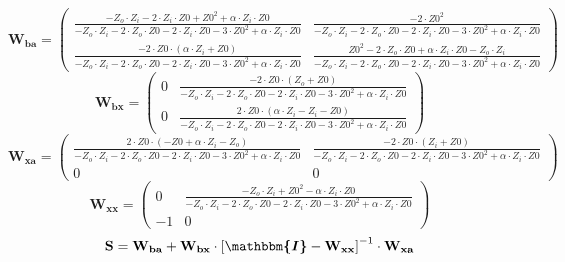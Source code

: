 \[ \mathbf{W_{ba}} = \left(\begin{smallmatrix} \frac{-Z_o\cdot
Z_i-2\cdot Z_i\cdot Z0+Z0^2+\alpha\cdot Z_i\cdot Z0}{-Z_o\cdot
Z_i-2\cdot Z_o\cdot Z0-2\cdot Z_i\cdot Z0-3\cdot Z0^2+\alpha\cdot
Z_i\cdot Z0} & \frac{-2\cdot Z0^2}{-Z_o\cdot Z_i-2\cdot Z_o\cdot
Z0-2\cdot Z_i\cdot Z0-3\cdot Z0^2+\alpha\cdot Z_i\cdot Z0} \\
\frac{-2\cdot Z0 \cdot (\alpha\cdot Z_i +Z0 )}{-Z_o\cdot Z_i-2\cdot
Z_o\cdot Z0-2\cdot Z_i\cdot Z0-3\cdot Z0^2+\alpha\cdot Z_i\cdot Z0} &
\frac{Z0^2-2\cdot Z_o\cdot Z0+\alpha\cdot Z_i\cdot Z0-Z_o\cdot
Z_i}{-Z_o\cdot Z_i-2\cdot Z_o\cdot Z0-2\cdot Z_i\cdot Z0-3\cdot
Z0^2+\alpha\cdot Z_i\cdot Z0} \end{smallmatrix}\right) \]
\[ \mathbf{W_{bx}} = \left(\begin{smallmatrix} 0 & \frac{-2\cdot
Z0\cdot (Z_o +Z0 )}{-Z_o\cdot Z_i-2\cdot Z_o\cdot Z0-2\cdot Z_i\cdot
Z0-3\cdot Z0^2+\alpha\cdot Z_i\cdot Z0} \\ 0 & \frac{2\cdot Z0\cdot
(\alpha\cdot Z_i-Z_i-Z0 )}{-Z_o\cdot Z_i-2\cdot Z_o\cdot Z0-2\cdot
Z_i\cdot Z0-3\cdot Z0^2+\alpha\cdot Z_i\cdot Z0}
\end{smallmatrix}\right) \]
\[ \mathbf{W_{xa}} = \left(\begin{smallmatrix} \frac{2\cdot Z0\cdot
(-Z0+\alpha\cdot Z_i-Z_o )}{-Z_o\cdot Z_i-2\cdot Z_o\cdot Z0-2\cdot
Z_i\cdot Z0-3\cdot Z0^2+\alpha\cdot Z_i\cdot Z0} & \frac{-2\cdot
Z0\cdot (Z_i+Z0 )}{-Z_o\cdot Z_i-2\cdot Z_o\cdot Z0-2\cdot Z_i\cdot
Z0-3\cdot Z0^2+\alpha\cdot Z_i\cdot Z0} \\ 0 & 0
\end{smallmatrix}\right) \]
\[ \mathbf{W_{xx}} = \left(\begin{smallmatrix} 0 & \frac{-Z_o\cdot
Z_i+Z0^2-\alpha\cdot Z_i\cdot Z0}{-Z_o\cdot Z_i-2\cdot Z_o\cdot
Z0-2\cdot Z_i\cdot Z0-3\cdot Z0^2+\alpha\cdot Z_i\cdot Z0} \\ -1 & 0
\end{smallmatrix}\right) \]
\[ \mathbf{S}=\mathbf{W_{ba}}+\mathbf{W_{bx}}\cdot\left[
\boldsymbol{\mathbbm{I}}
-\mathbf{W_{xx}}\right]^{-1}\cdot\mathbf{W_{xa}} \]
